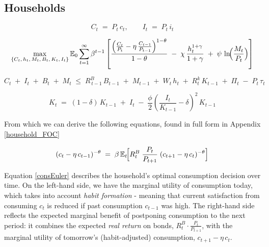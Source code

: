 \documentclass[11pt,preprint]{elsarticle}
\numberwithin{equation}{section}
\numberwithin{figure}{section}
\numberwithin{table}{section}
\begin{document}
\subsection{Households}\label{households}

\begin{equation}
C_t \;=\; P_t \, c_t,
\qquad
I_t \;=\; P_t \, i_t
\label{nominal_definitions}
\end{equation}

\begin{equation}
\max_{\{C_t,\,h_t,\,M_t,\,B_t,\,K_t,\,I_t\}}
\mathbb{E}_0 \sum_{t=1}^{\infty} \beta^{t-1}
\left[
\frac{\Bigl(\frac{C_t}{P_t} - \eta\,\frac{C_{t-1}}{P_{t-1}}\Bigr)^{1-\theta}}{1-\theta}
\;-\;\chi\,\frac{h_t^{1+\gamma}}{1+\gamma}
\;+\;\psi\,\ln\!\Bigl(\frac{M_t}{P_t}\Bigr)
\right]
\label{lifetime_utility_nominal}
\end{equation}

\begin{equation}
C_t \;+\; I_t \;+\; B_t \;+\; M_t
\;\le\;
R^B_{\,t-1}\,B_{t-1}
\;+\; M_{t-1}
\;+\; W_t\,h_t
\;+\; R^k_t\,K_{t-1}
\;+\; \Pi_t
\;-\; P_t\,\tau_t
\label{flow_constraint_nominal}
\end{equation}

\begin{equation}
K_t
\;=\;
(1 - \delta)\,K_{t-1}
\;+\; I_t
\;-\;\frac{\phi}{2}
\left(\frac{I_t}{K_{t-1}} - \delta\right)^{2}
\,K_{t-1}
\label{capital_accumulation_nominal}
\end{equation}

From which we can derive the following equations, found in full form in
Appendix \ref{household_FOC}

\begin{equation}\label{consEuler}
  (c_t - \eta\,c_{t-1})^{-\theta}
  \;=\;
  \beta\,\mathbb{E}_t\!\Bigl[
    R_t^B \;\frac{P_t}{P_{t+1}}\;(c_{t+1} - \eta\,c_t)^{-\theta}
  \Bigr]
\end{equation}

Equation \ref{consEuler} describes the household's optimal consumption
decision over time. On the left-hand side, we have the marginal utility
of consumption today, which takes into account \emph{habit formation} -
meaning that current satisfaction from consuming \(c_t\) is reduced if
past consumption \(c_{t-1}\) was high. The right-hand side reflects the
expected marginal benefit of postponing consumption to the next period:
it combines the expected \emph{real return} on bonds,
\(R_t^B \cdot \frac{P_t}{P_{t+1}}\), with the marginal utility of
tomorrow's (habit-adjusted) consumption, \(c_{t+1} - \eta\,c_t\).
\end{document}
